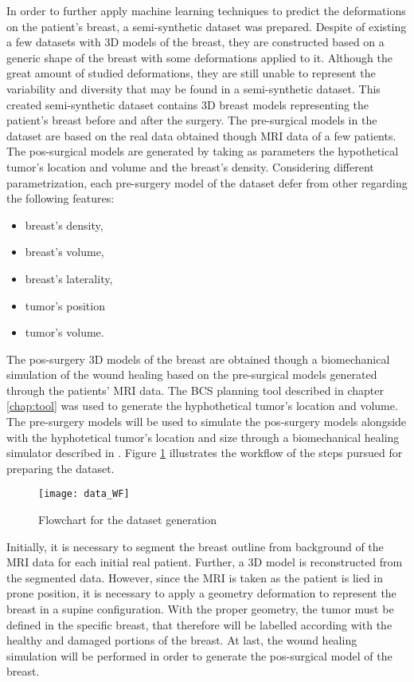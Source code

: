 In order to further apply machine learning techniques to predict the deformations on the patient's breast, a semi-synthetic dataset was prepared. Despite of existing a few datasets with 3D models of the breast, they are constructed based on a generic shape of the breast with some deformations applied to it. Although the great amount of studied deformations, they are still unable to represent the variability and diversity that may be found in a semi-synthetic dataset. This created semi-synthetic dataset contains 3D breast models representing the patient's breast before and after the surgery. The pre-surgical models in the dataset are based on the real data obtained though MRI data of a few patients. The pos-surgical models are generated by taking as parameters the hypothetical tumor's location and volume and the breast's density. Considering different parametrization, each pre-surgery model of the dataset defer from other regarding the following features:
\begin{itemize}
\item breast's density,
\item breast's volume,
\item breast's laterality,
\item tumor's position
\item tumor's volume.
\end{itemize} 
The pos-surgery 3D models of the breast are obtained though a biomechanical simulation of the wound healing based on the pre-surgical models generated through the patients' MRI data. The BCS planning tool described in chapter \ref{chap:tool} was used to generate the hyphothetical tumor's location and volume. The pre-surgery models will be used to simulate the pos-surgery models alongside with the hyphotetical tumor's location and size through a biomechanical healing simulator described in \cite{Vavourakis2016}. Figure \ref{fig:data_WF} illustrates the workflow of the steps pursued for preparing the dataset.

\begin{figure}[!h]
\begin{center}
    \leavevmode
    \texttt{[image: data\_WF]}
    \caption[Flowchart for the dataset generation]{Flowchart for the dataset generation}
    \label{fig:data_WF}
  \end{center}
\end{figure}

Initially, it is necessary to segment the breast outline from background of the MRI data for each initial real patient. Further, a 3D model is reconstructed from the segmented data. However, since the MRI is taken as the patient is lied in prone position, it is necessary to apply a geometry deformation to represent the breast in a supine configuration. With the proper geometry, the tumor must be defined in the specific breast, that therefore will be labelled according with the healthy and damaged portions of the breast. At last, the wound healing simulation will be performed in order to generate the pos-surgical model of the breast.



